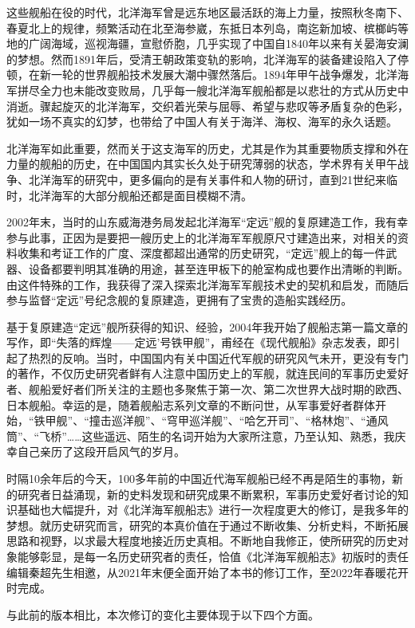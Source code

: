 \documentclass[12pt,UTF8]{ctexbook}
\begin{document}
这些舰船在役的时代，北洋海军曾是远东地区最活跃的海上力量，按照秋冬南下、春夏北上的规律，频繁活动在北至海参崴，东抵日本列岛，南迄新加坡、槟榔屿等地的广阔海域，巡视海疆，宣慰侨胞，几乎实现了中国自1840年以来有关晏海安澜的梦想。然而1891年后，受清王朝政策变轨的影响，北洋海军的装备建设陷入了停顿，在新一轮的世界舰船技术发展大潮中骤然落后。1894年甲午战争爆发，北洋海军拼尽全力也未能改变败局，几乎每一艘北洋海军舰船都是以悲壮的方式从历史中消逝。骤起旋灭的北洋海军，交织着光荣与屈辱、希望与悲叹等矛盾复杂的色彩，犹如一场不真实的幻梦，也带给了中国人有关于海洋、海权、海军的永久话题。

北洋海军如此重要，然而关于这支海军的历史，尤其是作为其重要物质支撑和外在力量的舰船的历史，在中国国内其实长久处于研究薄弱的状态，学术界有关甲午战争、北洋海军的研究中，更多偏向的是有关事件和人物的研讨，直到21世纪来临时，北洋海军的大部分舰船还都是面目模糊不清。

2002年末，当时的山东威海港务局发起北洋海军“定远”舰的复原建造工作，我有幸参与此事，正因为是要把一艘历史上的北洋海军军舰原尺寸建造出来，对相关的资料收集和考证工作的广度、深度都超出通常的历史研究，“定远”舰上的每一件武器、设备都要判明其准确的用途，甚至连甲板下的舱室构成也要作出清晰的判断。由这件特殊的工作，我获得了深入探索北洋海军军舰技术史的契机和启发，而随后参与监督“定远”号纪念舰的复原建造，更拥有了宝贵的造船实践经历。

基于复原建造“定远”舰所获得的知识、经验，2004年我开始了舰船志第一篇文章的写作，即“失落的辉煌——定远’号铁甲舰”，甫经在《现代舰船》杂志发表，即引起了热烈的反响。当时，中国国内有关中国近代军舰的研究风气未开，更没有专门的著作，不仅历史研究者鲜有人注意中国历史上的军舰，就连民间的军事历史爱好者、舰船爱好者们所关注的主题也多聚焦于第一次、第二次世界大战时期的欧西、日本舰船。幸运的是，随着舰船志系列文章的不断问世，从军事爱好者群体开始，“铁甲舰”、“撞击巡洋舰”、“穹甲巡洋舰”、“哈乞开司”、“格林炮”、“通风筒”、“飞桥”……这些遥远、陌生的名词开始为大家所注意，乃至认知、熟悉，我庆幸自己亲历了这段开启风气的岁月。

时隔10余年后的今天，100多年前的中国近代海军舰船已经不再是陌生的事物，新的研究者日益涌现，新的史料发现和研究成果不断累积，军事历史爱好者讨论的知识基础也大幅提升，对《北洋海军舰船志》进行一次程度更大的修订，是我多年的梦想。就历史研究而言，研究的本真价值在于通过不断收集、分析史料，不断拓展思路和视野，以求最大程度地接近历史真相。不断地自我修正，使所研究的历史对象能够彰显，是每一名历史研究者的责任，恰值《北洋海军舰船志》初版时的责任编辑秦超先生相邀，从2021年末便全面开始了本书的修订工作，至2022年春暖花开时完成。

与此前的版本相比，本次修订的变化主要体现于以下四个方面。
\end{document}
